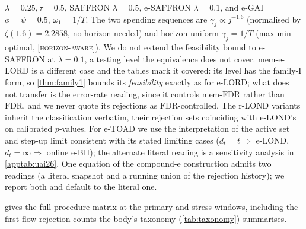 \documentclass[conference]{IEEEtran}
\newcommand{\FDR}{\mathrm{FDR}}
\newcommand{\oracle}{\textsc{[horizon-aware]}}
\begin{document}
$\lambda=0.25,\tau=0.5$, SAFFRON $\lambda=0.5$, e-SAFFRON $\lambda=0.1$, and e-GAI $\phi=\psi=0.5$,
$\omega_1=1/T$. The two spending sequences are $\gamma_j\propto j^{-1.6}$ (normalised by
$\zeta(1.6)=2.2858$, no horizon needed) and horizon-uniform $\gamma_j=1/T$ (max-min optimal, \oracle).
We do not extend the feasibility bound to e-SAFFRON at $\lambda=0.1$, a testing level the equivalence
does not cover. mem-e-LORD is a different case and the tables mark it covered: its level has the family-I
form, so \cref{thm:family1} bounds its \emph{feasibility} exactly as for e-LORD; what does not transfer
is the error-rate reading, since it controls mem-$\FDR$ rather than $\FDR$, and we never quote its
rejections as $\FDR$-controlled. The r-LOND variants inherit the classification
verbatim, their rejection sets coinciding with e-LOND's on calibrated $p$-values. For e-TOAD we use the
interpretation of the active set and step-up limit consistent with its stated limiting cases
($d_t=t\Rightarrow$ e-LOND, $d_t=\infty\Rightarrow$ online e-BH); the alternate literal reading is a
sensitivity analysis in \cref{apptab:uai26}. One equation of the compound-e construction admits two
readings (a literal snapshot and a running union of the rejection history); we report both and default
to the literal one.

 gives the full procedure matrix at the primary and stress windows, including the
first-flow rejection counts the body's taxonomy (\cref{tab:taxonomy}) summarises.
\end{document}
